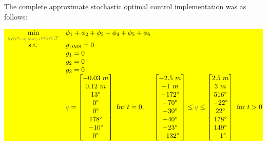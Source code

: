 \documentclass[10pt,letterpaper]{article}
\begin{document}
\pagebreak
The complete approximate stochastic optimal control implementation was as follows:
\colorbox{yellow}{%
    \parbox{\linewidth}{%
\begin{equation}
\begin{array}{ll@{}ll}
\underset{\textcolor{gray}{q}, \textcolor{gray}{\dot{q}}, \textcolor{gray}{\tau_{\text{voluntary}}}, \textcolor{gray}{\text{ref}}, \textcolor{gray}{K}, \textcolor{gray}{T}}{\min} & \phi_1 + \phi_2 + \phi_3 + \phi_4 + \phi_5 + \phi_6 \\
\text{~~~~~~~~~s.t.} & g_{\text{DMS}}=0 \\
            & g_1 = 0 \\
            & g_2 = 0 \\
            & g_3 = 0 \\
            & \textcolor{gray}{q} = \left[ \begin{matrix}-0.03~m \\ 0.12~m\\ 13\degree\\ 0\degree\\ 0\degree\\ 178\degree\\ -10\degree\\ 0\degree \end{matrix} \right]~\text{for}~t = 0, ~~~~ \left[ \begin{matrix} -2.5~m\\ -1~m\\ -172\degree\\ -70\degree\\ -30\degree\\ -40\degree\\ -23\degree\\ -132\degree \end{matrix} \right] \leq \textcolor{gray}{q} \leq \left[ \begin{matrix} 2.5~m\\ 3~m\\ 516\degree\\ -22\degree\\ 22\degree\\ 178\degree\\ 149\degree\\ -1\degree \end{matrix} \right]~\text{for}~t > 0 \\ 

\end{array}
\end{equation}}}
\end{document}
